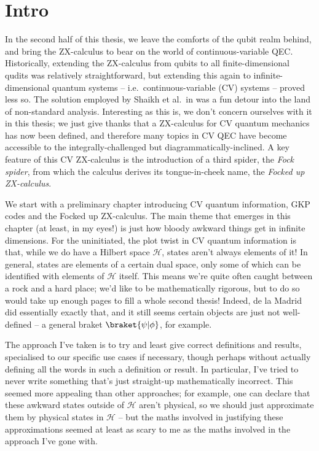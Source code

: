\section{Intro}

In the second half of this thesis, we leave the comforts of the qubit realm behind, and bring the ZX-calculus to bear on the world of continuous-variable QEC.
Historically, extending the ZX-calculus from qubits to all finite-dimensional qudits was relatively straightforward, but extending this again to infinite-dimensional quantum systems -- i.e.\ continuous-variable (CV) systems -- proved less so.
The solution employed by Shaikh et al.\ in  was a fun detour into the land of non-standard analysis.
Interesting as this is, we don't concern ourselves with it in this thesis; we just give thanks that a ZX-calculus for CV quantum mechanics has now been defined, and therefore many topics in CV QEC have become accessible to the integrally-challenged but diagrammatically-inclined.
A key feature of this CV ZX-calculus is the introduction of a third spider, the \textit{Fock spider}, from which the calculus derives its tongue-in-cheek name, the \textit{Focked up ZX-calculus}.

We start with a preliminary chapter introducing CV quantum information, GKP codes and the Focked up ZX-calculus.
The main theme that emerges in this chapter (at least, in my eyes!) is just how bloody awkward things get in infinite dimensions.
For the uninitiated, the plot twist in CV quantum information is that, while we do have a Hilbert space $\mathcal{H}$, states aren't always elements of it!
In general, states are elements of a certain dual space, only some of which can be identified with elements of $\mathcal{H}$ itself.
This means we're quite often caught between a rock and a hard place; we'd like to be mathematically rigorous, but to do so would take up enough pages to fill a whole second thesis!
Indeed, de la Madrid~\cite{delamadrid2001quantum} did essentially exactly that, and it still seems certain objects are just not well-defined -- a general braket $\braket{\psi|\phi}$, for example.

The approach I've taken is to try and least give correct definitions and results, specialised to our specific use cases if necessary, though perhaps without actually defining all the words in such a definition or result.
In particular, I've tried to never write something that's just straight-up mathematically incorrect.
This seemed more appealing than other approaches; for example, one can declare that these awkward states outside of $\mathcal{H}$ aren't physical, so we should just approximate them by physical states in $\mathcal{H}$ -- but the maths involved in justifying these approximations seemed at least as scary to me as the maths involved in the approach I've gone with.